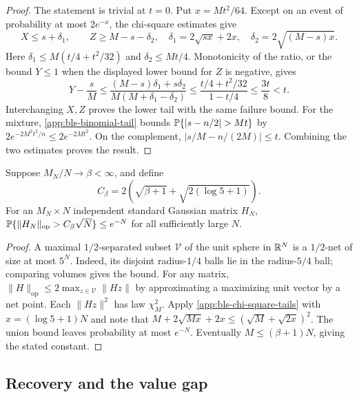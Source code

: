 \begin{proof}
The statement is trivial at $t=0$.  Put $x=Mt^2/64$.  Except on an event
of probability at most $2e^{-x}$, the chi-square estimates give
\[
 X\le s+\delta_1,\qquad Z\ge M-s-\delta_2,
 \quad \delta_1=2\sqrt{sx}+2x,
 \quad \delta_2=2\sqrt{(M-s)x}.
\]
Here $\delta_1\le M(t/4+t^2/32)$ and $\delta_2\le Mt/4$.
Monotonicity of the ratio, or the bound $Y\le1$ when the displayed lower
bound for $Z$ is negative, gives
\[
 Y-\frac sM
 \le\frac{(M-s)\delta_1+s\delta_2}
          {M(M+\delta_1-\delta_2)}
 \le\frac{t/4+t^2/32}{1-t/4}\le\frac{3t}{8}<t.
\]
Interchanging $X,Z$ proves the lower tail with the same failure bound.
For the mixture, \eqref{app:bls-binomial-tail} bounds
$\Pbb\{|s-n/2|>Mt\}$ by
$2e^{-2M^2t^2/n}\le2e^{-2Mt^2}$.  On the complement,
$|s/M-n/(2M)|\le t$.  Combining the two estimates proves the result.
\end{proof}

\begin{lemma}
\label{app:bls-operator-bound}
Suppose $M_N/N\to\beta<\infty$, and define
\begin{equation}
 C_\beta=2\left(\sqrt{\beta+1}+
                  \sqrt{2(\log5+1)}\right).
 \label{app:bls-operator-constant}
\end{equation}
For an $M_N\times N$ independent standard Gaussian matrix $H_N$,
$\mathbb{P}\{\|H_N\|_{\mathrm{op}}>C_\beta\sqrt N\}\le e^{-N}$ for all
sufficiently large $N$.
\end{lemma}

\begin{proof}
A maximal $1/2$-separated subset $\mathcal V$ of the unit sphere in
$\mathbb{R}^N$ is a $1/2$-net of size at most $5^N$.  Indeed, its disjoint
radius-$1/4$ balls lie in the radius-$5/4$ ball; comparing volumes gives
the bound.  For any matrix,
$\|H\|_{\mathrm{op}}\le2\max_{z\in\mathcal V}\|Hz\|$ by approximating
a maximizing unit vector by a net point.  Each $\|Hz\|^2$ has law
$\chi^2_M$.  Apply \eqref{app:bls-chi-square-tails} with
$x=(\log5+1)N$ and note that
$M+2\sqrt{Mx}+2x\le(\sqrt M+\sqrt{2x})^2$.
The union bound leaves probability at most $e^{-N}$.  Eventually
$M\le(\beta+1)N$, giving the stated constant.
\end{proof}

\subsection{Recovery and the value gap}
\label{app:bls-ml-proof}

